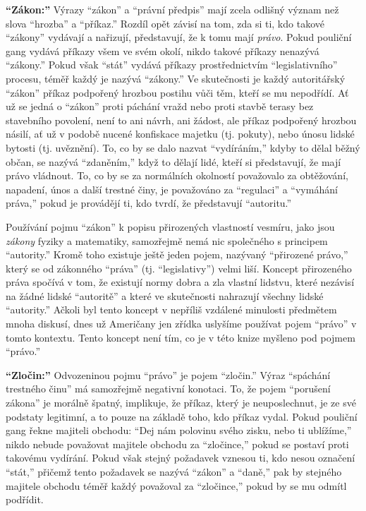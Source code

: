 \documentclass{book}
\begin{document}
\textbf{\enquote{Zákon:}} Výrazy \enquote{zákon} a \enquote{právní předpis} mají zcela odlišný význam než slova \enquote{hrozba} a \enquote{příkaz.} Rozdíl opět závisí na tom, zda si ti, kdo takové \enquote{zákony} vydávají a nařizují, představují, že k tomu mají \emph{právo}. Pokud pouliční gang vydává příkazy všem ve svém okolí, nikdo takové příkazy nenazývá \enquote{zákony.} Pokud však \enquote{stát} vydává příkazy prostřednictvím \enquote{legislativního} procesu, téměř každý je nazývá \enquote{zákony.} Ve skutečnosti je každý autoritářský \enquote{zákon} příkaz podpořený hrozbou postihu vůči těm, kteří se mu nepodřídí. Ať už se jedná o \enquote{zákon} proti páchání vražd nebo proti stavbě terasy bez stavebního povolení, není to ani návrh, ani žádost, ale příkaz podpořený hrozbou násilí, ať už v podobě nucené konfiskace majetku (tj. pokuty), nebo únosu lidské bytosti (tj. uvěznění). To, co by se dalo nazvat \enquote{vydíráním,} kdyby to dělal běžný občan, se nazývá \enquote{zdaněním,} když to dělají lidé, kteří si představují, že mají právo vládnout. To, co by se za normálních okolností považovalo za obtěžování, napadení, únos a další trestné činy, je považováno za \enquote{regulaci} a \enquote{vymáhání práva,} pokud je provádějí ti, kdo tvrdí, že představují \enquote{autoritu.}

Používání pojmu \enquote{zákon} k popisu přirozených vlastností vesmíru, jako jsou \emph{zákony} fyziky a matematiky, samozřejmě nemá nic společného s principem \enquote{autority.} Kromě toho existuje ještě jeden pojem, nazývaný \enquote{přirozené právo,} který se od zákonného \enquote{práva} (tj. \enquote{legislativy}) velmi liší. Koncept přirozeného práva spočívá v tom, že existují normy dobra a zla vlastní lidstvu, které nezávisí na žádné lidské \enquote{autoritě} a které ve skutečnosti nahrazují všechny lidské \enquote{autority.} Ačkoli byl tento koncept v nepříliš vzdálené minulosti předmětem mnoha diskusí, dnes už Američany jen zřídka uslyšíme používat pojem \enquote{právo} v tomto kontextu. Tento koncept není tím, co je v této knize myšleno pod pojmem \enquote{právo.}

\textbf{\enquote{Zločin:}} Odvozeninou pojmu \enquote{právo} je pojem \enquote{zločin.} Výraz \enquote{spáchání trestného činu} má samozřejmě negativní konotaci. To, že pojem \enquote{porušení zákona} je morálně špatný, implikuje, že příkaz, který je neuposlechnut, je ze své podstaty legitimní, a to pouze na základě toho, kdo příkaz vydal. Pokud pouliční gang řekne majiteli obchodu: \enquote{Dej nám polovinu svého zisku, nebo ti ublížíme,} nikdo nebude považovat majitele obchodu za \enquote{zločince,} pokud se postaví proti takovému vydírání. Pokud však stejný požadavek vznesou ti, kdo nesou označení \enquote{stát,} přičemž tento požadavek se nazývá \enquote{zákon} a \enquote{daně,} pak by stejného majitele obchodu téměř každý považoval za \enquote{zločince,} pokud by se mu odmítl podřídit.
\end{document}
